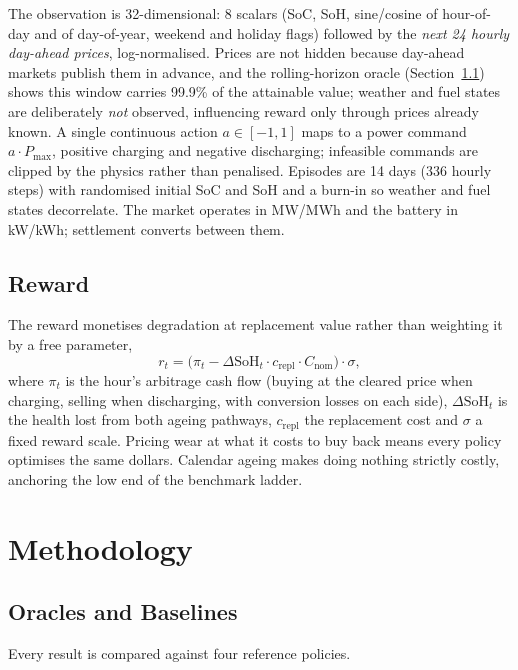 \documentclass[conference]{IEEEtran}
\begin{document}
The observation is 32-dimensional: 8 scalars (SoC, SoH, sine/cosine of hour-of-day and of day-of-year, weekend and holiday flags) followed by the \emph{next 24 hourly day-ahead prices}, log-normalised. Prices are not hidden because day-ahead markets publish them in advance, and the rolling-horizon oracle (Section~\ref{sec:oracles}) shows this window carries 99.9\% of the attainable value; weather and fuel states are deliberately \emph{not} observed, influencing reward only through prices already known. A single continuous action $a \in [-1, 1]$ maps to a power command $a \cdot P_{\max}$, positive charging and negative discharging; infeasible commands are clipped by the physics rather than penalised. Episodes are 14 days (336 hourly steps) with randomised initial SoC and SoH and a burn-in so weather and fuel states decorrelate. The market operates in MW/MWh and the battery in kW/kWh; settlement converts between them.

\subsection{Reward}
\label{sec:reward}

The reward monetises degradation at replacement value rather than weighting it by a free parameter,
\begin{equation}
  r_t = \bigl(\pi_t - \Delta\mathrm{SoH}_t \cdot c_{\mathrm{repl}} \cdot C_{\mathrm{nom}}\bigr) \cdot \sigma,
\end{equation}
where $\pi_t$ is the hour's arbitrage cash flow (buying at the cleared price when charging, selling when discharging, with conversion losses on each side), $\Delta\mathrm{SoH}_t$ is the health lost from both ageing pathways, $c_{\mathrm{repl}}$ the replacement cost and $\sigma$ a fixed reward scale. Pricing wear at what it costs to buy back means every policy optimises the same dollars. Calendar ageing makes doing nothing strictly costly, anchoring the low end of the benchmark ladder.

\section{Methodology}
\label{sec:methodology}

\subsection{Oracles and Baselines}
\label{sec:oracles}

Every result is compared against four reference policies.
\end{document}
